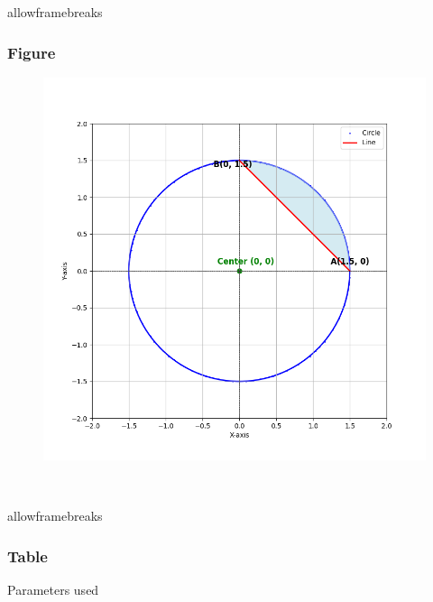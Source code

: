 \documentclass{beamer}
\begin{document}
\begin{frame}{allowframebreaks}
\frametitle{Figure}
\begin{figure}[h!]
   \centering
   \includegraphics[width=0.7\linewidth]{figs/plot.png}
   \caption{ }
   \label{plot}
\end{figure}\\
\end{frame}
\begin{frame}{allowframebreaks}
\frametitle{Table}
\begin{table}[h]
    \centering
    
    \caption{Parameters used}
    \label{}
\end{table}
\end{frame}
\end{document}
